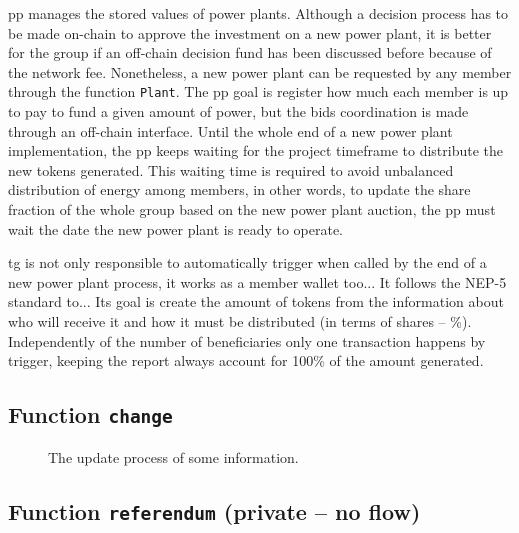 \gls{pp} manages the stored values of power plants.
Although a decision process has to be made on-chain to approve the investment on a new power plant, it is better for the group if an off-chain decision fund has been discussed before because of the network fee.
Nonetheless, a new power plant can be requested by any member through the function \verb|Plant|.
The \gls{pp} goal is register how much each member is up to pay to fund a given amount of power, but the bids coordination is made through an off-chain interface.
Until the whole end of a new power plant implementation, the \gls{pp} keeps waiting for the project timeframe to distribute the new tokens generated.
This waiting time is required to avoid unbalanced distribution of energy among members,
in other words, to update the share fraction of the whole group based on the new power plant auction, the \gls{pp} must wait the date the new power plant is ready to operate.

\hline

\gls{tg} is not only responsible to automatically trigger when called by the end of a new power plant process, it works as a member wallet too...
It follows the NEP-5 standard to...
Its goal is create the amount of tokens from the information about who will receive it and how it must be distributed (in terms of shares -- \%).
Independently of the number of beneficiaries only one transaction happens by trigger, keeping the report always account for 100\% of the amount generated.

\subsection*{Function \texttt{change}}

\begin{figure}[h!tbp]{\textwidth}
    \centering
    \caption{The update process of some information.}
    \frame{\resizebox{0.5\textwidth}{!}{}}
    \source{\copyright}
\end{figure}

\subsection*{Function \texttt{referendum} (private -- no flow)}

